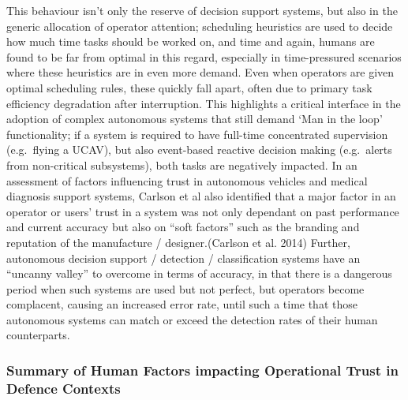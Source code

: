 This behaviour isn't only the reserve of decision support systems, but also in the generic allocation of operator attention; scheduling heuristics are used to decide how much time tasks should be worked on, and time and again, humans are found to be far from optimal in this regard, especially in time-pressured scenarios where these heuristics are in even more demand.
Even when operators are given optimal scheduling rules, these quickly fall apart, often due to primary task efficiency degradation after interruption.
This highlights a critical interface in the adoption of complex autonomous systems that still demand ‘Man in the loop’ functionality; if a system is required to have full-time concentrated supervision (e.g.\ flying a UCAV), but also event-based reactive decision making (e.g.\ alerts from non-critical subsystems), both tasks are negatively impacted.
In an assessment of factors influencing trust in autonomous vehicles and medical diagnosis support systems, Carlson et al also identified that a major factor in an operator or users’ trust in a system was not only dependant on past performance and current accuracy but also on ``soft factors'' such as the branding and reputation of the manufacture / designer.(Carlson et al. 2014)
Further, autonomous decision support / detection / classification systems have an ``uncanny valley'' to overcome in terms of accuracy, in that there is a dangerous period when such systems are used but not perfect, but operators become complacent, causing an increased error rate, until such a time that those autonomous systems can match or exceed the detection rates of their human counterparts.

\subsubsection{Summary of Human Factors impacting Operational Trust in Defence Contexts}

